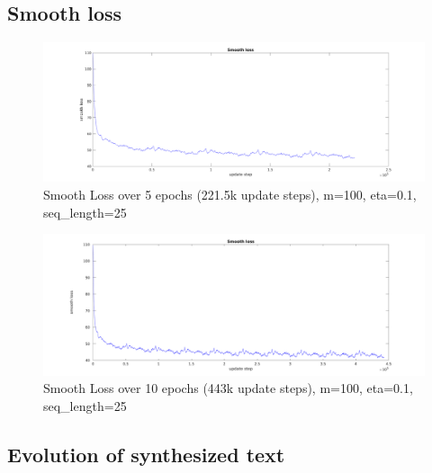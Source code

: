\subsection{Smooth loss}
\begin{figure}[ht]
    \includegraphics[width=\textwidth]{../code/results/smooth_loss_5epochs.png}
    \caption{Smooth Loss over 5 epochs (221.5k update steps), m=100, eta=0.1, seq\_length=25}
    \label{fig:loss5}
\end{figure}
\begin{figure}[ht]
    \includegraphics[width=\textwidth]{../code/results/smooth_loss_10epochs.png}
    \caption{Smooth Loss over 10 epochs (443k update steps), m=100, eta=0.1, seq\_length=25}
    \label{fig:loss10}
\end{figure}
\FloatBarrier
\subsection{Evolution of synthesized text}

